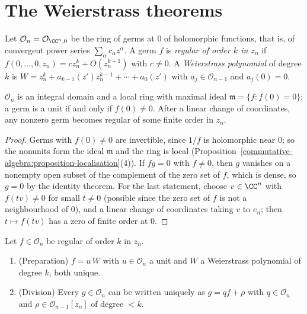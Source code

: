 \section{The Weierstrass theorems}\label{several-complex-variables:section-weierstrass}

\begin{definition}\label{several-complex-variables:definition-local-ring}
Let $\mathcal{O}_n = \mathcal{O}_{\CC^n, 0}$ be the ring of germs at $0$ of holomorphic functions, that is, of convergent power series $\sum_\alpha c_\alpha z^\alpha$. A germ $f$ is \emph{regular of
order $k$ in $z_n$} if $f(0, \ldots, 0, z_n) = cz_n^k + O(z_n^{k+1})$ with $c \neq 0$. A \emph{Weierstrass polynomial} of degree $k$ is
$W = z_n^k + a_{k-1}(z')z_n^{k-1} + \cdots + a_0(z')$ with $a_j \in \mathcal{O}_{n-1}$ and $a_j(0) = 0$.
\end{definition}

\begin{lemma}\label{several-complex-variables:lemma-local-ring-basic}
$\mathcal{O}_n$ is an integral domain and a local ring with maximal ideal $\mathfrak{m} = \{f : f(0) = 0\}$; a germ is a unit if and only if $f(0) \neq 0$. After a linear change of coordinates, any
nonzero germ becomes regular of some finite order in $z_n$.
\end{lemma}

\begin{proof}
Germs with $f(0) \neq 0$ are invertible, since $1/f$ is holomorphic near $0$; so the nonunits form the ideal $\mathfrak{m}$ and the ring is local
(Proposition~\ref{commutative-algebra:proposition-localisation}(4)). If $fg = 0$ with $f \neq 0$, then $g$ vanishes on a nonempty open subset of the complement of the zero set of $f$, which is dense, so
$g = 0$ by the identity theorem. For the last statement, choose $v \in \CC^n$ with $f(tv) \neq 0$ for small $t \neq 0$ (possible since the zero set of $f$ is not a neighbourhood of $0$), and a linear change
of coordinates taking $v$ to $e_n$; then $t \mapsto f(tv)$ has a zero of finite order at $0$.
\end{proof}

\begin{theorem}\label{several-complex-variables:theorem-weierstrass}
Let $f \in \mathcal{O}_n$ be regular of order $k$ in $z_n$.
\begin{enumerate}
\item (Preparation) $f = u\,W$ with $u \in \mathcal{O}_n$ a unit and $W$ a Weierstrass polynomial of degree $k$, both unique.
\item (Division) Every $g \in \mathcal{O}_n$ can be written uniquely as $g = qf + \rho$ with $q \in \mathcal{O}_n$ and $\rho \in \mathcal{O}_{n-1}[z_n]$ of degree $< k$.
\end{enumerate}
\end{theorem}

